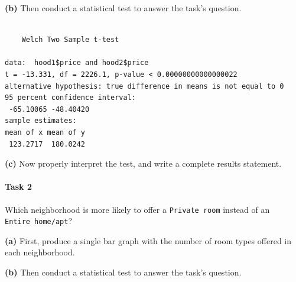 \documentclass[
]{book}
\newenvironment{Shaded}{\begin{snugshade}}{\end{snugshade}}
\newcommand{\KeywordTok}[1]{\textcolor[rgb]{0.13,0.29,0.53}{\textbf{#1}}}
\newcommand{\NormalTok}[1]{#1}
\newcommand{\OperatorTok}[1]{\textcolor[rgb]{0.81,0.36,0.00}{\textbf{#1}}}
\begin{document}
\textbf{(b)} Then conduct a statistical test to answer the task's question.

\begin{Shaded}
\end{Shaded}

\begin{verbatim}

    Welch Two Sample t-test

data:  hood1$price and hood2$price
t = -13.331, df = 2226.1, p-value < 0.00000000000000022
alternative hypothesis: true difference in means is not equal to 0
95 percent confidence interval:
 -65.10065 -48.40420
sample estimates:
mean of x mean of y 
 123.2717  180.0242 
\end{verbatim}

\textbf{(c)} Now properly interpret the test, and write a complete results statement.

\hypertarget{task-2}{%
\paragraph{Task 2}\label{task-2}}

Which neighborhood is more likely to offer a \texttt{Private\ room} instead of an \texttt{Entire\ home/apt}?

\textbf{(a)} First, produce a single bar graph with the number of room types offered in each neighborhood.

\textbf{(b)} Then conduct a statistical test to answer the task's question.
\end{document}
